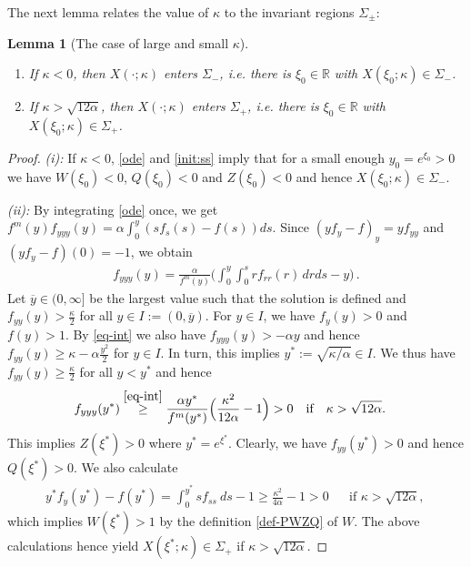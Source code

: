 \documentclass{article}%
\newtheorem{lemma}[theorem]{Lemma}
\newcommand{\alp}{\alpha}
\newcommand{\kap}{\kappa}
\newcommand{\R}{\mathbb{R}}
\begin{document}
The next lemma relates the value of $\kappa$ to the invariant regions
$\Sigma_\pm$:
\begin{lemma}[The case of large and small $\kappa$] \label{lem-kapextreme} \text{} %
  \begin{enumerate}
  \item If $\kappa<0$, then $X(\cdot;\kap)$ enters $\Sigma_{-}$, i.e. there is $\xi_0 \in \R$ with $X(\xi_0;\kap) \in\Sigma_{-}$.
  \item If $\kappa >\sqrt{12\alpha}$, then $X(\cdot;\kappa)$ enters $\Sigma_{+}$, i.e. there is $\xi_0 \in \R$ with
    $X(\xi_0;\kappa) \in\Sigma_{+}$.
  \end{enumerate}
\end{lemma}
\begin{proof} 
  {\it (i):} If $\kappa < 0$, \eqref{ode} and \eqref{init:ss} imply that for a small enough 
$y_0 = e^{\xi_0} > 0$ we have $W(\xi_0) < 0$, $Q(\xi_0) < 0$ and $Z(\xi_0) <0$ and hence 
$X(\xi_0;\kap) \in \Sigma_-$.

  \medskip

{\it (ii):} By integrating \eqref{ode} once, we get $f^m(y)f_{yyy}(y) =\alp \int_0^y( sf_s(s) - f(s)) ds$. 
Since  $(y f_{y} - f)_y = yf_{yy}$ and $(yf_y - f)(0) = -1$, we obtain
  \begin{align}\label{eq-int}
    f_{yyy}(y) =\frac{\alp}{f^m(y)} \Big(\int_0^y \int_0^s r f_{rr}(r) \, dr ds  - y \Big)\,.
  \end{align}
Let $\overline y \in (0,\infty]$ be the largest value such that the
 solution is defined and $f_{yy}(y) > \frac \kap 2$ for all
 $y \in I := (0,\overline y)$. For $y \in I$, we have $f_y(y) > 0$ and 
$f(y) > 1$. By \eqref{eq-int} we also have $f_{yyy}(y) > -\alpha y$ and hence 
$f_{yy}(y) \geq \kap -\alpha \frac{y^2}2$ for $y \in I$. In turn, this implies 
$y^* := \sqrt{\kap /\alpha} \in I$. We thus have 
$f_{yy}(y) \geq \frac \kap 2$ for all $y < y^*$ and hence
\begin{align} %
    f_{yyy}(y^*) %
    &
\stackrel{\eqref{eq-int}}{\geq}
\frac{\alp y^* }{f^m(y^*)} \Big( \frac{\kap^{2}}{12\alpha} - 1 \Big) > 0 \quad
    \text{if}\quad \kap >\sqrt{12\alpha}.
\end{align}
This implies $Z(\xi^*) > 0$ where $y^* = e^{\xi^*}$. Clearly, we have 
$f_{yy}(y^*) > 0$ and hence $Q(\xi^*) > 0$. We also calculate
\begin{align*} 
    y^* f_y(y^*) - f(y^*) =
    \int_0^{y^*} s f_{ss} \ ds - 1 \geq \frac {\kap^2 }{4\alpha}
    - 1 > 0 &&\text{if $\kap > \sqrt{12\alpha}$, }
\end{align*}
which implies $W(\xi^*) > 1$ by the definition \eqref{def-PWZQ} of $W$. 
The above calculations hence yield $X(\xi^*;\kappa) \in \Sigma_+$ if $\kappa >\sqrt{12\alpha}$.
\end{proof}
\end{document}
